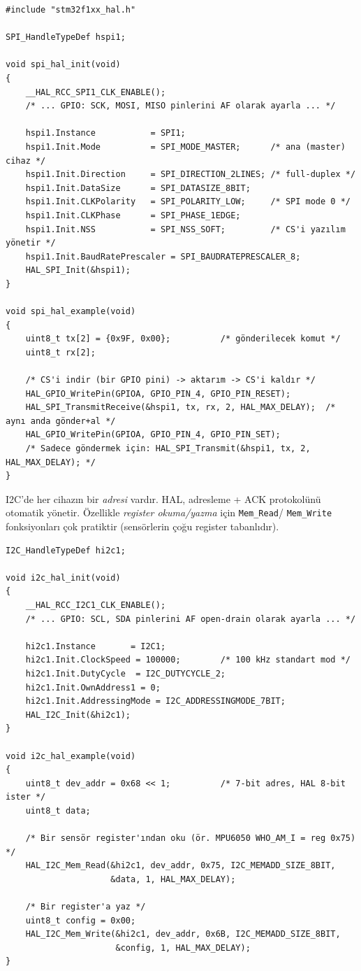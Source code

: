 \documentclass[11pt,a4paper]{article}
\newcounter{secc}
\newcounter{subsecc}[secc]
\newcounter{subsubsecc}[subsecc]
\newcommand{\gsubsub}[1]{\par\phantomsection\stepcounter{subsubsecc}%
  \vspace{7pt}{\color{koyuGri}\normalsize\bfseries #1}\par\vspace{2pt}}
\newcommand{\code}[1]{\texttt{\color{koyuGri}#1}}
\begin{document}
\begin{lstlisting}
#include "stm32f1xx_hal.h"

SPI_HandleTypeDef hspi1;

void spi_hal_init(void)
{
    __HAL_RCC_SPI1_CLK_ENABLE();
    /* ... GPIO: SCK, MOSI, MISO pinlerini AF olarak ayarla ... */

    hspi1.Instance           = SPI1;
    hspi1.Init.Mode          = SPI_MODE_MASTER;      /* ana (master) cihaz */
    hspi1.Init.Direction     = SPI_DIRECTION_2LINES; /* full-duplex */
    hspi1.Init.DataSize      = SPI_DATASIZE_8BIT;
    hspi1.Init.CLKPolarity   = SPI_POLARITY_LOW;     /* SPI mode 0 */
    hspi1.Init.CLKPhase      = SPI_PHASE_1EDGE;
    hspi1.Init.NSS           = SPI_NSS_SOFT;         /* CS'i yazılım yönetir */
    hspi1.Init.BaudRatePrescaler = SPI_BAUDRATEPRESCALER_8;
    HAL_SPI_Init(&hspi1);
}

void spi_hal_example(void)
{
    uint8_t tx[2] = {0x9F, 0x00};          /* gönderilecek komut */
    uint8_t rx[2];

    /* CS'i indir (bir GPIO pini) -> aktarım -> CS'i kaldır */
    HAL_GPIO_WritePin(GPIOA, GPIO_PIN_4, GPIO_PIN_RESET);
    HAL_SPI_TransmitReceive(&hspi1, tx, rx, 2, HAL_MAX_DELAY);  /* aynı anda gönder+al */
    HAL_GPIO_WritePin(GPIOA, GPIO_PIN_4, GPIO_PIN_SET);
    /* Sadece göndermek için: HAL_SPI_Transmit(&hspi1, tx, 2, HAL_MAX_DELAY); */
}
\end{lstlisting}

\gsubsub{HAL ile I2C}

I2C'de her cihazın bir \emph{adresi} vardır. HAL, adresleme + ACK protokolünü
otomatik yönetir. Özellikle \emph{register okuma/yazma} için \code{Mem\_Read}/
\code{Mem\_Write} fonksiyonları çok pratiktir (sensörlerin çoğu register
tabanlıdır).

\begin{lstlisting}
I2C_HandleTypeDef hi2c1;

void i2c_hal_init(void)
{
    __HAL_RCC_I2C1_CLK_ENABLE();
    /* ... GPIO: SCL, SDA pinlerini AF open-drain olarak ayarla ... */

    hi2c1.Instance       = I2C1;
    hi2c1.Init.ClockSpeed = 100000;        /* 100 kHz standart mod */
    hi2c1.Init.DutyCycle  = I2C_DUTYCYCLE_2;
    hi2c1.Init.OwnAddress1 = 0;
    hi2c1.Init.AddressingMode = I2C_ADDRESSINGMODE_7BIT;
    HAL_I2C_Init(&hi2c1);
}

void i2c_hal_example(void)
{
    uint8_t dev_addr = 0x68 << 1;          /* 7-bit adres, HAL 8-bit ister */
    uint8_t data;

    /* Bir sensör register'ından oku (ör. MPU6050 WHO_AM_I = reg 0x75) */
    HAL_I2C_Mem_Read(&hi2c1, dev_addr, 0x75, I2C_MEMADD_SIZE_8BIT,
                     &data, 1, HAL_MAX_DELAY);

    /* Bir register'a yaz */
    uint8_t config = 0x00;
    HAL_I2C_Mem_Write(&hi2c1, dev_addr, 0x6B, I2C_MEMADD_SIZE_8BIT,
                      &config, 1, HAL_MAX_DELAY);
}
\end{lstlisting}
\end{document}
